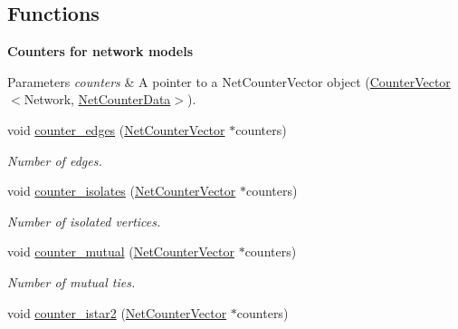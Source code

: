 \subsection*{Functions}
\begin{Indent}\textbf{ Counters for network models}\par
{\em 
\begin{DoxyParams}{Parameters}
{\em counters} & A pointer to a {\ttfamily Net\+Counter\+Vector} object ({\ttfamily \hyperlink{classbarry_1_1_counter_vector}{Counter\+Vector}}$<${\ttfamily Network}, {\ttfamily \hyperlink{classbarry_1_1counters_1_1network_1_1_net_counter_data}{Net\+Counter\+Data}}$>$). \\
\hline
\end{DoxyParams}
}\begin{DoxyCompactItemize}
\item 
void \hyperlink{namespacebarry_1_1counters_1_1network_a3c0a9e6c5697b3ec65827d405826bb33}{counter\+\_\+edges} (\hyperlink{namespacebarry_1_1counters_1_1network_a3b3c590303d47840d1967372ae495d95}{Net\+Counter\+Vector} $\ast$counters)
\begin{DoxyCompactList}\small\item\em Number of edges. \end{DoxyCompactList}\item 
void \hyperlink{namespacebarry_1_1counters_1_1network_a16449353394312feed59aa5444d17dad}{counter\+\_\+isolates} (\hyperlink{namespacebarry_1_1counters_1_1network_a3b3c590303d47840d1967372ae495d95}{Net\+Counter\+Vector} $\ast$counters)
\begin{DoxyCompactList}\small\item\em Number of isolated vertices. \end{DoxyCompactList}\item 
void \hyperlink{namespacebarry_1_1counters_1_1network_afc4086d5788c8d5fa60ec529d9fa15dd}{counter\+\_\+mutual} (\hyperlink{namespacebarry_1_1counters_1_1network_a3b3c590303d47840d1967372ae495d95}{Net\+Counter\+Vector} $\ast$counters)
\begin{DoxyCompactList}\small\item\em Number of mutual ties. \end{DoxyCompactList}\item 
void \hyperlink{namespacebarry_1_1counters_1_1network_a95eea8464d85c595efa305cdf9a5a82b}{counter\+\_\+istar2} (\hyperlink{namespacebarry_1_1counters_1_1network_a3b3c590303d47840d1967372ae495d95}{Net\+Counter\+Vector} $\ast$counters)
\item 

\end{DoxyCompactItemize}
\end{Indent}
